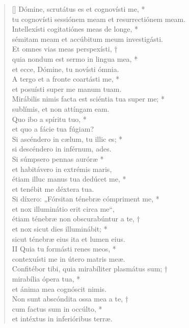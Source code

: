 \begin{verse}[\versewidth]
Dómine, scrutátus es et cognovísti me, *\\
tu cognovísti sessiónem meam et resurrectiónem meam.\\
\vin Intellexísti cogitatiónes meas de longe, *\\
\vin sémitam meam et accúbitum meum investigásti.\\
Et omnes vias meas perspexísti, †\\
quia nondum est sermo in lingua mea, *\\
et ecce, Dómine, tu novísti ómnia.\\
\vin A tergo et a fronte coartásti me, *\\
\vin et posuísti super me manum tuam.\\
Mirábilis nimis facta est sciéntia tua super me; *\\
sublímis, et non attíngam eam.\\
\vin Quo ibo a spíritu tuo, *\\
\vin et quo a fácie tua fúgiam?\\
Si ascéndero in cælum, tu illic es; *\\
si descéndero in inférnum, ades.\\
\vin Si súmpsero pennas auróræ *\\
\vin et habitávero in extrémis maris,\\
étiam illuc manus tua dedúcet me, *\\
et tenébit me déxtera tua.\\
\vin Si díxero: „Fórsitan ténebræ cómpriment me, *\\
\vin et nox illuminátio erit circa me“,\\
étiam ténebræ non obscurabúntur a te, †\\
et nox sicut dies illuminábit; *\\
sicut ténebræ eius ita et lumen eius.\\
II
Quia tu formásti renes meos, *\\
contexuísti me in útero matris meæ.\\
Confitébor tibi, quia mirabíliter plasmátus sum; †\\
mirabília ópera tua, *\\
et ánima mea cognóscit nimis.\\
Non sunt abscóndita ossa mea a te, †\\
cum factus sum in occúlto, *\\
et intéxtus in inferióribus terræ.\\

\end{verse}
